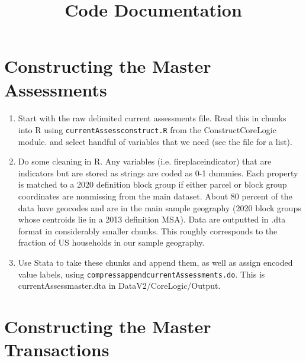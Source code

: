 \documentclass[]{article}
\title{Code Documentation}
\author{}
\begin{document}
\maketitle


\section{Constructing the Master Assessments}
\paragraph*{}
\begin{enumerate}
	\item Start with the raw delimited current assessments file. Read this in chunks into R using \texttt{currentAssess\textunderscore construct.R} from the Construct\textunderscore CoreLogic module. and select handful of variables that we need (see the file for a list).
	
	\item Do some cleaning in R. Any variables (i.e. fireplaceindicator) that are indicators but are stored as strings are coded as 0-1 dummies. Each property is matched to a 2020 definition block group if either parcel or block group coordinates are nonmissing from the main dataset. About 80 percent of the data have geocodes and are in the main sample geography (2020 block groups whose centroids lie in a 2013 definition MSA). Data are outputted in .dta format in considerably smaller chunks. This roughly corresponds to the fraction of US households in our sample geography. 
	
	\item Use Stata to take these chunks and append them, as well as assign encoded value labels, using \texttt{compress\textunderscore append\textunderscore currentAssessments.do}. This is currentAssess\textunderscore master.dta in DataV2/CoreLogic/Output. 
\end{enumerate}

\section{Constructing the Master Transactions}
\end{document}
